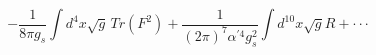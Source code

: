 \begin{equation}
-\frac{1}{8\pi g_s}\int d^4x \sqrt{g} \, Tr(F^2)+\frac{1}{(2\pi)^7\alpha^{\prime 4}g_s^2}
\int d^{10}x \sqrt{g}R + \cdot\cdot\cdot\label{e15}
\end{equation}


